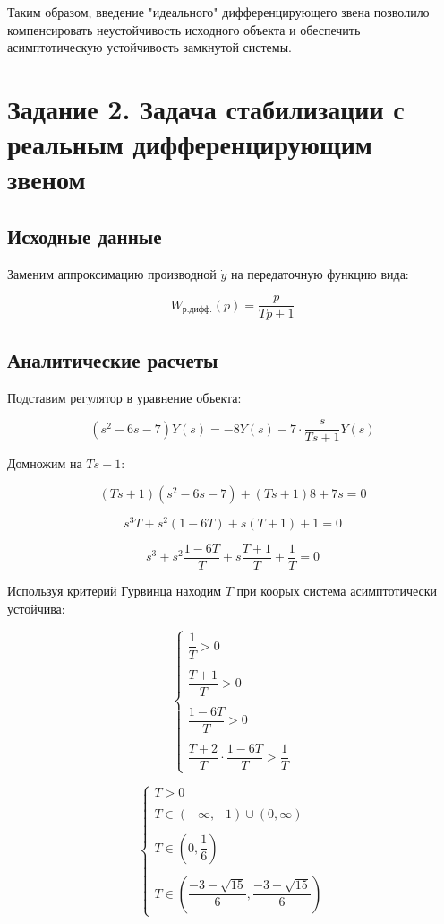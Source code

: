 \documentclass[a5paper, 10pt]{article}
\theoremstyle{definition}
\theoremstyle{plain}
\theoremstyle{remark}
\begin{document}
Таким образом, введение "идеального" дифференцирующего звена позволило компенсировать неустойчивость исходного объекта и обеспечить асимптотическую устойчивость замкнутой системы. 


\newpage

\section{Задание 2. Задача стабилизации с реальным дифференцирующим звеном}

\subsection{Исходные данные}

Заменим аппроксимацию производной $\dot{y}$ на передаточную функцию вида:

$$
W_\text{р.дифф.}(p)=\dfrac{p}{Tp+1}
$$

\subsection{Аналитические расчеты}

Подставим регулятор в уравнение объекта:

$$
(s^2-6s-7)Y(s)=-8Y(s)-7\cdot \dfrac{s}{Ts+1}Y(s)
$$

Домножим на $Ts+1$:

$$
(Ts+1)(s^2-6s-7)+(Ts+1)8+7s=0
$$

$$
s^3T+s^2(1-6T)+s(T+1)+1=0
$$

$$
s^3+s^2\dfrac{1-6T}{T}+s\dfrac{T+1}{T}+\dfrac{1}{T}=0
$$

Используя критерий Гурвинца находим $T$ при коорых система асимптотически устойчива:

$$
\begin{cases}
    \dfrac{1}{T}>0\\\\
    \dfrac{T+1}{T}>0\\\\
    \dfrac{1-6T}{T}>0\\\\
    \dfrac{T+2}{T}\cdot\dfrac{1-6T}{T}>\dfrac{1}{T}
\end{cases}
$$
\vspace{0.3cm}

$$
\begin{cases}
    T>0\\\\
    T \in (-\infty,-1)\cup(0,\infty)\\\\
    T \in \left(0,\dfrac{1}{6}\right)\\\\
    T \in \left(\dfrac{-3-\sqrt{15}}{6},\dfrac{-3+\sqrt{15}}{6}\right)
\end{cases}
$$
\end{document}
